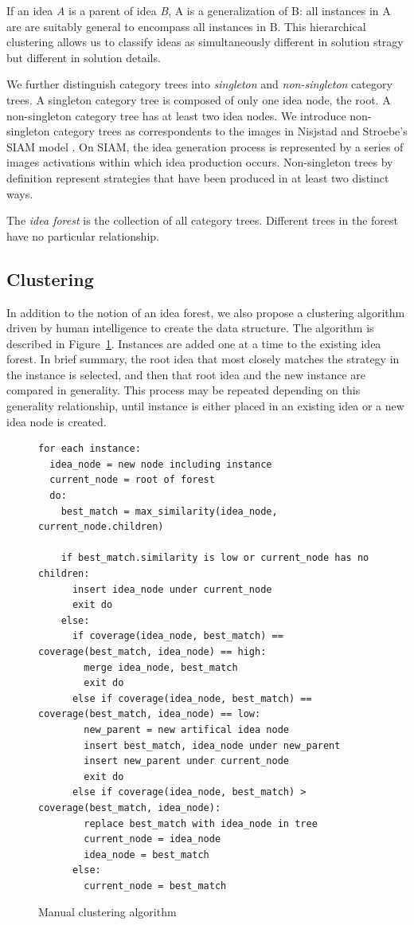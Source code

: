 If an idea \emph{A} is a parent of idea \emph{B}, A is a generalization of B: all instances in A are are suitably general to encompass all instances in B. This hierarchical clustering allows us to classify ideas as simultaneously different in solution stragy but different in solution details.

We further distinguish category trees into \emph{singleton} and \emph{non-singleton} category trees. A singleton category tree is composed of only one idea node, the root. A non-singleton category tree has at least two idea nodes. We introduce non-singleton category trees as correspondents to the images in Nisjstad and Stroebe's SIAM model \cite{nijstad_how_2006}. On SIAM, the idea generation process is represented by a series of images activations within which idea production occurs. Non-singleton trees by definition represent strategies that have been produced in at least two distinct ways.

The \emph{idea forest} is the collection of all category trees. Different trees in the forest have no particular relationship.

\subsection{Clustering}

In addition to the notion of an idea forest, we also propose a clustering algorithm driven by human intelligence to create the data structure. The algorithm is described in Figure~\ref{fig:cluseringalg}. Instances are added one at a time to the existing idea forest. In brief summary, the root idea that most closely matches the strategy in the instance is selected, and then that root idea and the new instance are compared in generality. This process may be repeated depending on this generality relationship, until instance is either placed in an existing idea or a new idea node is created.

\begin{figure}[ht]
\small
\begin{verbatim}
for each instance:
  idea_node = new node including instance
  current_node = root of forest
  do:
    best_match = max_similarity(idea_node, current_node.children)

    if best_match.similarity is low or current_node has no children:
      insert idea_node under current_node
      exit do
    else:
      if coverage(idea_node, best_match) == coverage(best_match, idea_node) == high:
        merge idea_node, best_match
        exit do
      else if coverage(idea_node, best_match) == coverage(best_match, idea_node) == low:
        new_parent = new artifical idea node
        insert best_match, idea_node under new_parent
        insert new_parent under current_node
        exit do
      else if coverage(idea_node, best_match) > coverage(best_match, idea_node):
        replace best_match with idea_node in tree
        current_node = idea_node
        idea_node = best_match
      else:
        current_node = best_match
\end{verbatim}
\caption{Manual clustering algorithm}
\label{fig:cluseringalg}
\end{figure}

